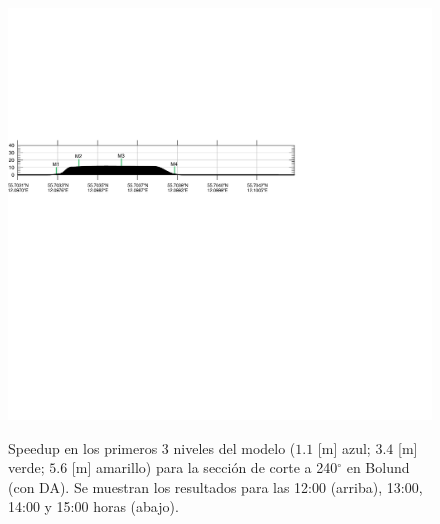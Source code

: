\begin{figure}[H]
	\includegraphics[width=0.95\linewidth,trim={-11mm 193mm 115mm 112mm},clip]{Imagenes/06/bol_da/cross_height}\\%
	\caption{Speedup en los primeros 3 niveles del modelo ($1.1$ [m] azul; $3.4$ [m] verde; $5.6$ [m] amarillo) para la sección de corte a 240$^\circ$ en Bolund (con DA). Se muestran los resultados para las 12:00 (arriba), 13:00, 14:00 y 15:00 horas (abajo).}
	\label{fig:06_bol_da_speedup}
\end{figure}
\vspace*{\fill}
\newpage
\vspace*{\fill}
